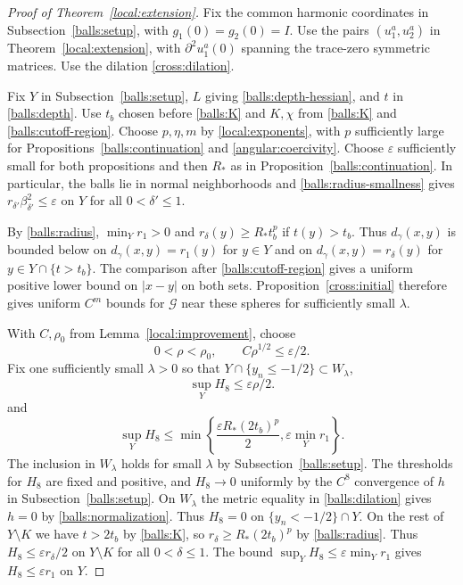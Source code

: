 \documentclass[11pt,a4paper]{article}
\theoremstyle{definition}
\theoremstyle{remark}
\numberwithin{equation}{section}
\begin{document}
\begin{proof}[Proof of Theorem~\ref{local:extension}]
Fix the common harmonic coordinates in Subsection~\ref{balls:setup},
with $g_1(0)=g_2(0)=I$. Use the pairs $(u_1^a,u_2^a)$ in
Theorem~\ref{local:extension}, with $\partial^2u_1^a(0)$ spanning
the trace-zero symmetric matrices. Use the dilation
\eqref{cross:dilation}.

Fix $Y$ in Subsection~\ref{balls:setup}, $L$ giving
\eqref{balls:depth-hessian}, and $t$ in \eqref{balls:depth}.
Use $t_b$ chosen before \eqref{balls:K} and $K,\chi$ from
\eqref{balls:K} and \eqref{balls:cutoff-region}. Choose $p,\eta,m$
by \eqref{local:exponents}, with $p$ sufficiently large for
Propositions~\ref{balls:continuation} and \ref{angular:coercivity}.
Choose $\varepsilon$ sufficiently small for both propositions and
then $R_*$ as in Proposition~\ref{balls:continuation}. In particular,
the balls lie in normal neighborhoods and \eqref{balls:radius-smallness}
gives $r_{\delta'}\beta_{\delta'}^2\le\varepsilon$ on $Y$ for all
$0<\delta'\le1$.

By \eqref{balls:radius}, $\min_Y r_1>0$ and
$r_\delta(y)\ge R_*t_b^p$ if $t(y)>t_b$. Thus $d_\gamma(x,y)$
is bounded below on $d_\gamma(x,y)=r_1(y)$ for $y\in Y$ and on
$d_\gamma(x,y)=r_\delta(y)$ for $y\in Y\cap\{t>t_b\}$.
The comparison after \eqref{balls:cutoff-region} gives a uniform
positive lower bound on $|x-y|$ on both sets. Proposition~\ref{cross:initial}
therefore gives uniform $C^m$ bounds for $\mathcal G$ near these
spheres for sufficiently small $\lambda$.

With $C,\rho_0$ from Lemma~\ref{local:improvement}, choose
\begin{equation}\label{local:rho-choice}
 0<\rho<\rho_0,\qquad C\rho^{1/2}\leq\varepsilon/2.
\end{equation}
Fix one sufficiently small $\lambda>0$ so that
$Y\cap\{y_n\le-1/2\}\subset W_\lambda$,
\begin{equation}\label{local:one-dilation}
 \sup_Y H_8\leq\varepsilon\rho/2.
\end{equation}
and
\[
 \sup_Y H_8\le
 \min\left\{\frac{\varepsilon R_*(2t_b)^p}{2},
             \varepsilon\min_Y r_1\right\}.
\]
The inclusion in $W_\lambda$ holds for small $\lambda$ by
Subsection~\ref{balls:setup}. The thresholds for $H_8$ are fixed
and positive, and $H_8\to0$ uniformly by the $C^8$ convergence of
$h$ in Subsection~\ref{balls:setup}. On $W_\lambda$ the metric
equality in \eqref{balls:dilation} gives $h=0$ by
\eqref{balls:normalization}.
Thus $H_8=0$ on $\{y_n<-1/2\}\cap Y$.
On the rest of $Y\setminus K$ we have $t>2t_b$ by \eqref{balls:K},
so $r_\delta\ge R_*(2t_b)^p$ by \eqref{balls:radius}. Thus
$H_8\le\varepsilon r_\delta/2$ on $Y\setminus K$ for all $0<\delta\le1$.
The bound $\sup_Y H_8\le\varepsilon\min_Y r_1$ gives
$H_8\le\varepsilon r_1$ on $Y$.


\end{proof}
\end{document}

